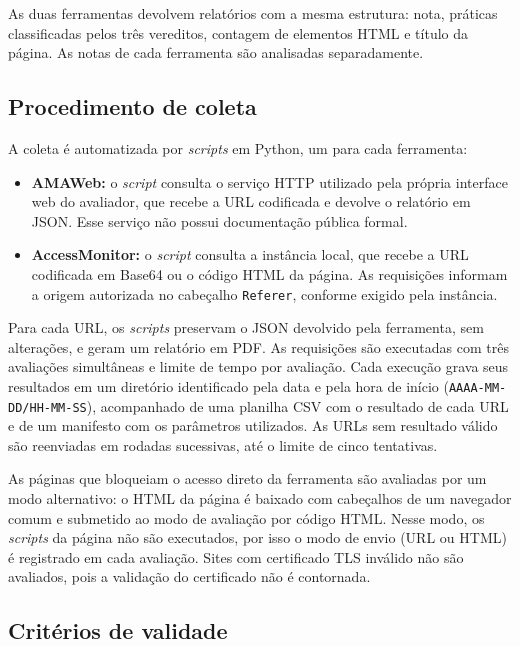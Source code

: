 \documentclass[12pt]{article}
\begin{document}
As duas ferramentas devolvem relatórios com a mesma estrutura: nota, práticas classificadas pelos três vereditos, contagem de elementos HTML e título da página. As notas de cada ferramenta são analisadas separadamente.

\subsection{Procedimento de coleta}

A coleta é automatizada por \textit{scripts} em Python, um para cada ferramenta:
\begin{itemize}
  \item \textbf{AMAWeb:} o \textit{script} consulta o serviço HTTP utilizado pela própria interface web do avaliador, que recebe a URL codificada e devolve o relatório em JSON. Esse serviço não possui documentação pública formal.
  \item \textbf{AccessMonitor:} o \textit{script} consulta a instância local, que recebe a URL codificada em Base64 ou o código HTML da página. As requisições informam a origem autorizada no cabeçalho \texttt{Referer}, conforme exigido pela instância.
\end{itemize}

Para cada URL, os \textit{scripts} preservam o JSON devolvido pela ferramenta, sem alterações, e geram um relatório em PDF. As requisições são executadas com três avaliações simultâneas e limite de tempo por avaliação. Cada execução grava seus resultados em um diretório identificado pela data e pela hora de início (\texttt{AAAA-MM-DD/HH-MM-SS}), acompanhado de uma planilha CSV com o resultado de cada URL e de um manifesto com os parâmetros utilizados. As URLs sem resultado válido são reenviadas em rodadas sucessivas, até o limite de cinco tentativas.

As páginas que bloqueiam o acesso direto da ferramenta são avaliadas por um modo alternativo: o HTML da página é baixado com cabeçalhos de um navegador comum e submetido ao modo de avaliação por código HTML. Nesse modo, os \textit{scripts} da página não são executados, por isso o modo de envio (URL ou HTML) é registrado em cada avaliação. Sites com certificado TLS inválido não são avaliados, pois a validação do certificado não é contornada.

\subsection{Critérios de validade}
\end{document}
